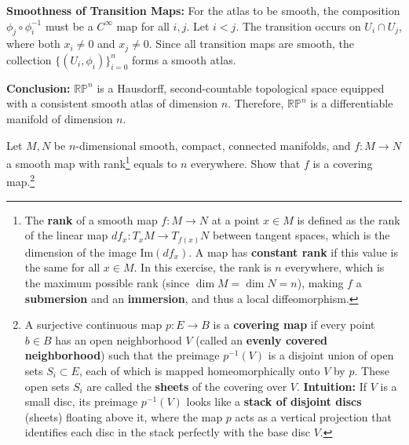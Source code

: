 \begin{solution}
\textbf{Smoothness of Transition Maps:}
For the atlas to be smooth, the composition $\phi_j \circ \phi_i^{-1}$ must be a $C^\infty$ map for all $i, j$. Let $i < j$. The transition occurs on $U_i \cap U_j$, where both $x_i \neq 0$ and $x_j \neq 0$.
Since all transition maps are smooth, the collection $\{(U_i, \phi_i)\}_{i=0}^n$ forms a smooth atlas.

\textbf{Conclusion:}
$\mathbb{RP}^n$ is a Hausdorff, second-countable topological space equipped with a consistent smooth atlas of dimension $n$. Therefore, $\mathbb{RP}^n$ is a differentiable manifold of dimension $n$.
\end{solution}

\clearpage

\begin{exercise}
\label{geometry:2012:8}
Let $M, N$ be $n$-dimensional smooth, compact, connected manifolds, and $f : M \to N$ a smooth map with rank\footnote{The \textbf{rank} of a smooth map $f: M \to N$ at a point $x \in M$ is defined as the rank of the linear map $df_x: T_x M \to T_{f(x)} N$ between tangent spaces, which is the dimension of the image $\text{Im}(df_x)$. A map has \textbf{constant rank} if this value is the same for all $x \in M$. In this exercise, the rank is $n$ everywhere, which is the maximum possible rank (since $\dim M = \dim N = n$), making $f$ a \textbf{submersion} and an \textbf{immersion}, and thus a local diffeomorphism.} equals to $n$ everywhere. Show that $f$ is a covering map.\footnote{A surjective continuous map $p: E \to B$ is a \textbf{covering map} if every point $b \in B$ has an open neighborhood $V$ (called an \textbf{evenly covered neighborhood}) such that the preimage $p^{-1}(V)$ is a disjoint union of open sets $S_i \subset E$, each of which is mapped homeomorphically onto $V$ by $p$. These open sets $S_i$ are called the \textbf{sheets} of the covering over $V$. \textbf{Intuition:} If $V$ is a small disc, its preimage $p^{-1}(V)$ looks like a \textbf{stack of disjoint discs} (sheets) floating above it, where the map $p$ acts as a vertical projection that identifies each disc in the stack perfectly with the base disc $V$.}
\end{exercise}

